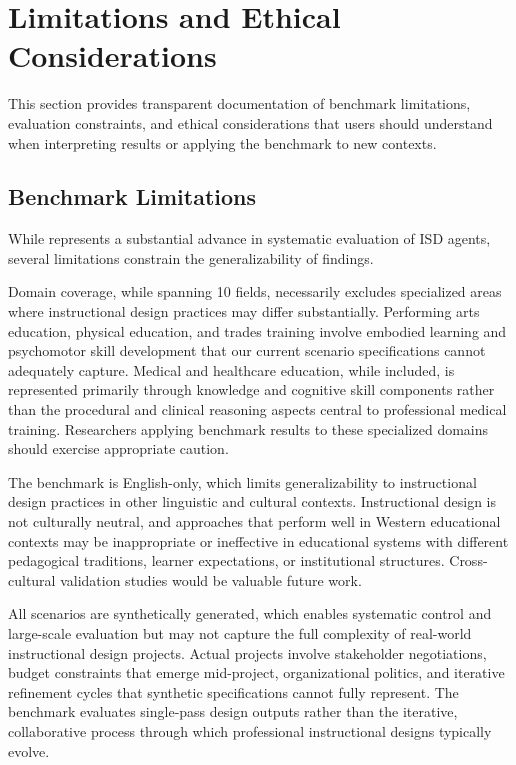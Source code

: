\FloatBarrier
\section{Limitations and Ethical Considerations}
\label{app:limitations}

This section provides transparent documentation of benchmark limitations, evaluation constraints, and ethical considerations that users should understand when interpreting results or applying the benchmark to new contexts.

\subsection{Benchmark Limitations}

While \benchmark{} represents a substantial advance in systematic evaluation of ISD agents, several limitations constrain the generalizability of findings.

Domain coverage, while spanning 10 fields, necessarily excludes specialized areas where instructional design practices may differ substantially. Performing arts education, physical education, and trades training involve embodied learning and psychomotor skill development that our current scenario specifications cannot adequately capture. Medical and healthcare education, while included, is represented primarily through knowledge and cognitive skill components rather than the procedural and clinical reasoning aspects central to professional medical training. Researchers applying benchmark results to these specialized domains should exercise appropriate caution.

The benchmark is English-only, which limits generalizability to instructional design practices in other linguistic and cultural contexts. Instructional design is not culturally neutral, and approaches that perform well in Western educational contexts may be inappropriate or ineffective in educational systems with different pedagogical traditions, learner expectations, or institutional structures. Cross-cultural validation studies would be valuable future work.

All scenarios are synthetically generated, which enables systematic control and large-scale evaluation but may not capture the full complexity of real-world instructional design projects. Actual projects involve stakeholder negotiations, budget constraints that emerge mid-project, organizational politics, and iterative refinement cycles that synthetic specifications cannot fully represent. The benchmark evaluates single-pass design outputs rather than the iterative, collaborative process through which professional instructional designs typically evolve.

